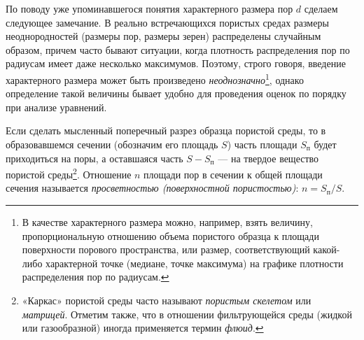 \setcounter{footnote}{0}
По поводу уже упоминавшегося понятия характерного размера пор $d$ сделаем следующее замечание. В реально встречающихся пористых средах размеры неоднородностей (размеры пор, размеры зерен) распределены случайным образом, причем часто бывают ситуации, когда плотность распределения пор по радиусам имеет даже несколько максимумов. Поэтому, строго говоря, введение характерного размера может быть произведено \textit{неоднозначно}\footnote{В качестве характерного размера можно, например, взять величину, пропорциональную отношению объема пористого образца к площади поверхности порового пространства, или размер, соответствующий какой-либо характерной точке (медиане, точке максимума) на графике плотности распределения пор по радиусам.}, однако определение такой величины бывает удобно для проведения оценок по порядку при анализе уравнений.

Если сделать мысленный поперечный разрез образца пористой среды, то в образовавшемся сечении (обозначим его площадь $S$) часть площади $S_{\text{п}}$ будет приходиться на поры, а оставшаяся часть $S-S_{\text{п}}$ --- на твердое вещество пористой среды\footnote{«Каркас» пористой среды часто называют \textit{пористым скелетом} или \textit{матрицей}. Отметим также, что в отношении фильтрующейся среды (жидкой или газообразной) иногда применяется термин \textit{флюид}.}. Отношение $n$ площади пор в сечении к общей площади сечения называется \textit{просветностью (поверхностной пористостью)}: $n=S_{\text{п}}/S$.

